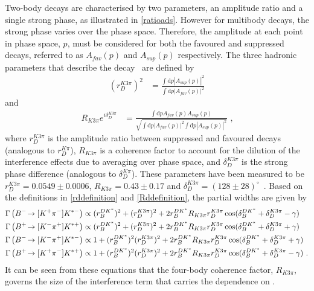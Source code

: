 Two-body \decay{\D}{\Kmp\pipm} decays are characterised by two parameters, an amplitude ratio and a single strong phase, as illustrated in \eqn\ref{ratioads}. However for multibody \decay{\D}{\Kmp\pipm\pimp\pipm} decays, the strong phase varies over the phase space. Therefore, the amplitude at each point in phase space, $p$, must be considered for both the \decay{\Dz}{\Km\pip\pim\pip} favoured and \decay{\Dz}{\Kp\pim\pip\pim} suppressed decays, referred to as $A_{fav}(p)$ and $A_{sup}(p)$ respectively. The three hadronic parameters that describe the \decay{\D}{\Km\pip\pim\pip} decay~\cite{charmk3pi,charmk3pi_errata,LHCb-PAPER-2015-057} are defined by
\begin{align}
\left(r_D^{K3\pi}\right)^2 &= \frac{\int \mathrm{d}p \left|A_{sup}(p)\right|^2}{\int \mathrm{d}p \left|A_{fav}(p)\right|^2}
\label{rddefinition}
\end{align}
and
\begin{align}
R_{K3\pi} e^{i\delta_D^{K3\pi}} &= \frac{\int \mathrm{d}p A_{fav}(p)A_{sup}(p)}{\sqrt{\int \mathrm{d}p \left|A_{fav}(p)\right|^2 \int \mathrm{d}p \left|A_{sup}(p)\right|^2}} \text { ,}
\label{Rddefinition}
\end{align}
where $r_D^{K3\pi}$ is the amplitude ratio between suppressed and favoured \decay{\D}{\Km\pip\pim\pip} decays (analogous to $r_D^{K\pi}$), $R_{K3\pi}$ is a coherence factor to account for the dilution of the interference effects due to averaging over phase space, and $\delta_D^{K3\pi}$ is the strong phase difference (analogous to $\delta_D^{K\pi}$). These parameters have been measured to be $r_D^{K3\pi} = 0.0549 \pm 0.0006$, $R_{K3\pi} = 0.43 \pm 0.17$ and $\delta_D^{K3\pi} = \left(128 \pm 28\right)^{\circ}$~\cite{charmk3pi,charmk3pi_errata,LHCb-PAPER-2015-057}. Based on the definitions in \eqns\ref{rddefinition} and \ref{Rddefinition}, the partial widths are given by
\begin{align}
\Gamma\left({{{B}^-}}\!\rightarrow [{{K}^+}{{\pi}^-}]{\ensuremath{{K}^{*-}}}\right) &\propto (r_B^{DK^*})^2 + (r_D^{K3\pi})^2 + 2r_B^{DK^*}R_{K3\pi}r_D^{K3\pi}\cos(\delta_B^{DK^*} + \delta_D^{K3\pi} - \gamma) \label{adsBdecaym4body} \\
\Gamma\left({{{B}^+}}\!\rightarrow [{{K}^-}{{\pi}^+}]{\ensuremath{{K}^{*+}}}\right) &\propto (r_B^{DK^*})^2 + (r_D^{K3\pi})^2 + 2r_B^{DK^*}R_{K3\pi}r_D^{K3\pi}\cos(\delta_B^{DK^*} + \delta_D^{K3\pi} + \gamma) \label{adsBdecayp4body} \\
\Gamma\left({{{B}^-}}\!\rightarrow [{{K}^-}{{\pi}^+}]{\ensuremath{{K}^{*-}}}\right) &\propto 1 + (r_B^{DK^*})^2(r_D^{K3\pi})^2 + 2r_B^{DK^*}R_{K3\pi}r_D^{K3\pi}\cos(\delta_B^{DK^*} + \delta_D^{K3\pi} + \gamma) \label{favBdecaym4body} \\
\Gamma\left({{{B}^+}}\!\rightarrow [{{K}^+}{{\pi}^-}]{\ensuremath{{K}^{*+}}}\right) &\propto 1 + (r_B^{DK^*})^2(r_D^{K3\pi})^2 + 2r_B^{DK^*}R_{K3\pi}r_D^{K3\pi}\cos(\delta_B^{DK^*} + \delta_D^{K3\pi} - \gamma) \text{ .}\label{favBdecayp4body} 
\end{align}
It can be seen from these equations that the four-body coherence factor, $R_{K3\pi}$, governs the size of the interference term that carries the dependence on \Pgamma.

